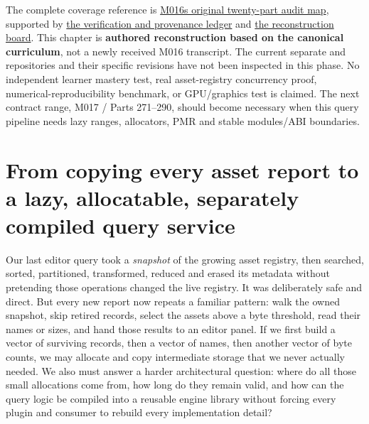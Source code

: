The complete coverage reference is \hyperref[appendix-fd090d982a15-m016-parts-251270-the-asset-registry-becomes-a-query-and-transformation-pipeline]{M016\textquotesingle s original twenty-part audit map}, supported by \hyperref[appendix-a103e7846d21-phase-6-additive-reconstruction-m016-parts-251270]{the verification and provenance ledger} and \hyperref[appendix-960160274237-query-the-registry-without-confusing-identity-and-a-snapshot-m016-reconstruction]{the reconstruction board}. This chapter is \textbf{authored reconstruction based on the canonical curriculum}, not a newly received M016 transcript. The current separate  and  repositories and their specific revisions have not been inspected in this phase. No independent learner mastery test, real asset-registry concurrency proof, numerical-reproducibility benchmark, or GPU/graphics test is claimed. The next contract range, M017 / Parts 271--290, should become necessary when this query pipeline needs lazy ranges, allocators, PMR and stable modules/ABI boundaries.

\section{From copying every asset report to a lazy, allocatable, separately compiled query service}\label{05-engine-i-ch006-from-copying-every-asset-report-to-a-lazy-allocatable-separately-compiled-query-service}

\hypertarget{05-engine-i-ch006-from-copying-every-asset-report-to-a-lazy-allocatable-separately-compiled-query-service}{}

Our last editor query took a \emph{snapshot} of the growing asset registry, then searched, sorted, partitioned, transformed, reduced and erased its metadata without pretending those operations changed the live registry. It was deliberately safe and direct. But every new report now repeats a familiar pattern: walk the owned snapshot, skip retired records, select the assets above a byte threshold, read their names or sizes, and hand those results to an editor panel. If we first build a vector of surviving records, then a vector of names, then another vector of byte counts, we may allocate and copy intermediate storage that we never actually needed. We also must answer a harder architectural question: where do all those small allocations come from, how long do they remain valid, and how can the query logic be compiled into a reusable engine library without forcing every plugin and consumer to rebuild every implementation detail?

